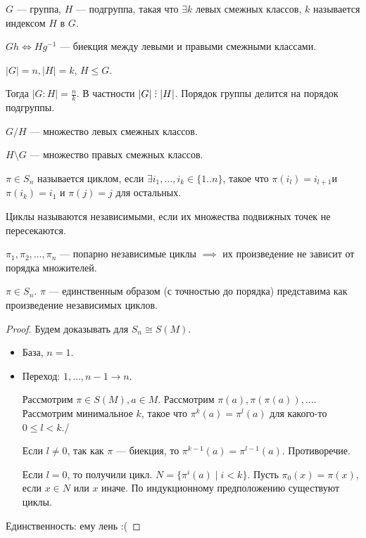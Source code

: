 \begin{definition}
    $G$ --- группа,  $H$ --- подгруппа, такая что  $\exists k$ левых смежных классов,  $k$ называется индексом  $H$ в  $G$.
\end{definition}
\begin{exerc}
    $Gh \iff Hg^{-1}$ --- биекция между левыми и правыми смежными классами.
\end{exerc}
\begin{theorem}
    $|G| = n, |H| = k$,  $H \le G$.

    Тогда $|G:H| = \frac{n}{k}$. В частности $|G| \divby |H|$. Порядок группы делится на порядок подгруппы.
\end{theorem}
\begin{definition}
    $G / H$ --- множество левых смежных классов.

    $H \setminus G$ --- множество правых смежных классов.
\end{definition}
\begin{definition}
    $\pi \in S_n$ называется циклом, если  $\exists i_1, \ldots, i_k \in \{1..n\}$, такое что $\pi(i_l) = i_{l+1}$и  $\pi(i_k) = i_1$ и  $\pi(j) = j$ для остальных.
\end{definition}
\begin{definition}
    Циклы называются независимыми, если их множества подвижных точек не пересекаются.
\end{definition}
\begin{remark}
    $\pi_1, \pi_2, \ldots, \pi_n$ --- попарно независимые циклы $\implies$ их произведение не зависит от порядка множителей.
\end{remark}
\begin{theorem}
    $\pi \in S_n$.  $\pi$ --- единственным образом (с точностью до порядка) представима как произведение независимых циклов.
\end{theorem}
\begin{proof}
    Будем доказывать для $S_n \cong S(M)$.

     \begin{itemize}
         \item База, $n = 1$. 
         \item Переход: $1,\ldots, n-1 \to n$.

             Рассмотрим $\pi \in S(M), a \in M$. Рассмотрим  $\pi(a), \pi(\pi(a)), \ldots$. Рассмотрим минимальное $k$, такое что  $\pi^k(a) = \pi^l(a)$ для какого-то  $0 \le l < k$./

             Если $l \neq 0$, так как  $\pi$ --- биекция, то  $\pi^{k-1}(a) = \pi^{l-1}(a)$. Противоречие.

             Если  $l = 0$, то получили цикл.  $N = \{ \pi^{i}(a) \mid i < k \}$. Пусть  $\pi_0(x) = \pi(x)$, если  $x \in N$ или  $x$ иначе. По индукционному предположению существуют циклы.
    \end{itemize}

    Единственность: ему лень :(
\end{proof}

